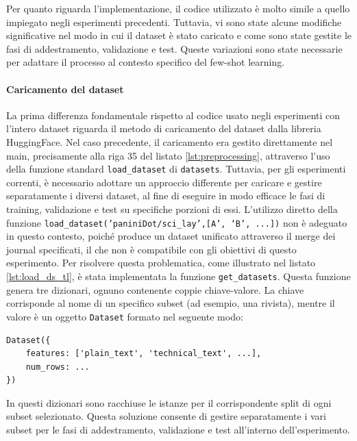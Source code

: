 \documentclass[12pt,a4paper,twoside,openright]{book}
\begin{document}
Per quanto riguarda l'implementazione, il codice utilizzato è molto simile a quello impiegato negli esperimenti precedenti. Tuttavia, vi sono state alcune modifiche significative nel modo in cui il dataset è stato caricato e come sono state gestite le fasi di addestramento, validazione e test. Queste variazioni sono state necessarie per adattare il processo al contesto specifico del few-shot learning.

\paragraph{Caricamento del dataset}
La prima differenza fondamentale rispetto al codice usato negli esperimenti con l'intero dataset riguarda il metodo di caricamento del dataset dalla libreria HuggingFace. Nel caso precedente, il caricamento era gestito direttamente nel main, precisamente alla riga 35 del listato \ref{lst:preprocessing}, attraverso l'uso della funzione standard \texttt{load\_dataset} di \texttt{datasets}. Tuttavia, per gli esperimenti correnti, è necessario adottare un approccio differente per caricare e gestire separatamente i diversi dataset, al fine di eseguire in modo efficace le fasi di training, validazione e test su specifiche porzioni di essi.
L'utilizzo diretto della funzione \texttt{load\_dataset('paniniDot/sci\_lay',[A', `B', ...])} non è adeguato in questo contesto, poiché produce un dataset unificato attraverso il merge dei journal specificati, il che non è compatibile con gli obiettivi di questo esperimento.
Per risolvere questa problematica, come illustrato nel listato \ref{lst:load_ds_tl}, è stata implementata la funzione \texttt{get\_datasets}. Questa funzione genera tre dizionari, ognuno contenente coppie chiave-valore. La chiave corrisponde al nome di un specifico subset (ad esempio, una rivista), mentre il valore è un oggetto \texttt{Dataset} formato nel seguente modo:

\begin{lstlisting}[basicstyle=\footnotesize]
Dataset({
    features: ['plain_text', 'technical_text', ...],
    num_rows: ...
})
\end{lstlisting}

In questi dizionari sono racchiuse le istanze per il corrispondente split di ogni subset selezionato. Questa soluzione consente di gestire separatamente i vari subset per le fasi di addestramento, validazione e test all'interno dell'esperimento.
\end{document}
